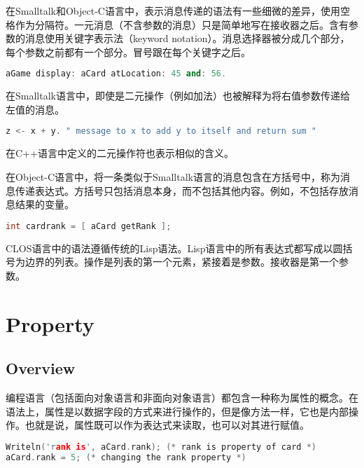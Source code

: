 在Smalltalk和Object-C语言中，表示消息传递的语法有一些细微的差异，使用空格作为分隔符。一元消息（不含参数的消息）只是简单地写在接收器之后。含有参数的消息使用关键字表示法（keyword notation）。消息选择器被分成几个部分，每个参数之前都有一个部分。冒号跟在每个关键字之后。

\begin{lstlisting}[language=C++]
aGame display: aCard atLocation: 45 and: 56.
\end{lstlisting}


在Smalltalk语言中，即使是二元操作（例如加法）也被解释为将右值参数传递给左值的消息。

\begin{lstlisting}[language=C++]
z <- x + y. " message to x to add y to itself and return sum "
\end{lstlisting}

在C++语言中定义的二元操作符也表示相似的含义。

在Object-C语言中，将一条类似于Smalltalk语言的消息包含在方括号中，称为消息传递表达式。方括号只包括消息本身，而不包括其他内容。例如，不包括存放消息结果的变量。


\begin{lstlisting}[language=C++]
int cardrank = [ aCard getRank ];
\end{lstlisting}


CLOS语言中的语法遵循传统的Lisp语法。Lisp语言中的所有表达式都写成以圆括号为边界的列表。操作是列表的第一个元素，紧接着是参数。接收器是第一个参数。



\chapter{Property}



\section{Overview}

编程语言（包括面向对象语言和非面向对象语言）都包含一种称为属性的概念。在语法上，属性是以数据字段的方式来进行操作的，但是像方法一样，它也是内部操作。也就是说，属性既可以作为表达式来读取，也可以对其进行赋值。




\begin{lstlisting}[language=C++]
Writeln('rank is', aCard.rank); (* rank is property of card *)
aCard.rank = 5; (* changing the rank property *)
\end{lstlisting}

